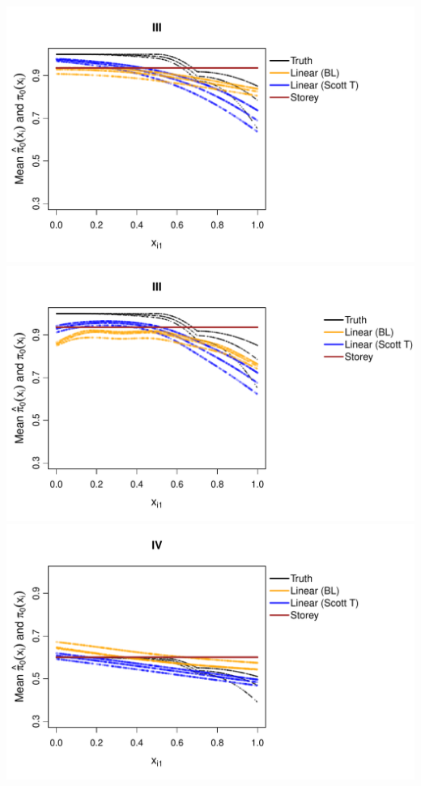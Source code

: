\documentclass{article}\usepackage[]{graphicx}\usepackage[]{color}
\makeatletter
\def\maxwidth{ %
  \ifdim\Gin@nat@width>\linewidth
    \linewidth
  \else
    \Gin@nat@width
  \fi
}
\newenvironment{knitrout}{}{} %
\makeatother
\begin{document}
\begin{knitrout}
{\includegraphics[width=\maxwidth]{Figures/plot_of_mean_estimates_t-4} 
\includegraphics[width=\maxwidth]{Figures/plot_of_mean_estimates_t-5} 
\includegraphics[width=\maxwidth]{Figures/plot_of_mean_estimates_t-6} 
}
\end{knitrout}
\end{document}

